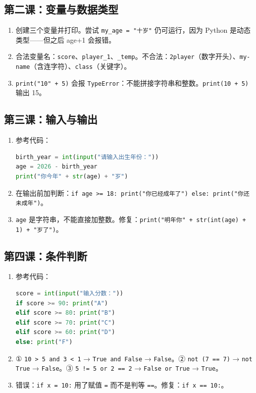 \documentclass[a4paper,12pt]{ctexart}
\begin{document}
\subsection*{第二课：变量与数据类型}
\begin{enumerate}
  \item 创建三个变量并打印。尝试 \texttt{my\_age = "十岁"} 仍可运行，因为 Python 是动态类型——但之后 age+1 会报错。
  \item 合法变量名：\texttt{score}、\texttt{player\_1}、\texttt{\_temp}。不合法：\texttt{2player}（数字开头）、\texttt{my-name}（含连字符）、\texttt{class}（关键字）。
  \item \texttt{print("10" + 5)} 会报 \texttt{TypeError}：不能拼接字符串和整数。\texttt{print(10 + 5)} 输出 15。
\end{enumerate}

\subsection*{第三课：输入与输出}
\begin{enumerate}
  \item 参考代码：
\begin{lstlisting}[language=Python]
birth_year = int(input("请输入出生年份："))
age = 2026 - birth_year
print("你今年" + str(age) + "岁")
\end{lstlisting}
  \item 在输出前加判断：\texttt{if age >= 18: print("你已经成年了") else: print("你还未成年")}。
  \item \texttt{age} 是字符串，不能直接加整数。修复：\texttt{print("明年你" + str(int(age) + 1) + "岁了")}。
\end{enumerate}

\subsection*{第四课：条件判断}
\begin{enumerate}
  \item 参考代码：
\begin{lstlisting}[language=Python]
score = int(input("输入分数："))
if score >= 90: print("A")
elif score >= 80: print("B")
elif score >= 70: print("C")
elif score >= 60: print("D")
else: print("F")
\end{lstlisting}
  \item ① \texttt{10 > 5 and 3 < 1} → \texttt{True and False} → \texttt{False}。② \texttt{not (7 == 7)} → \texttt{not True} → \texttt{False}。③ \texttt{5 != 5 or 2 == 2} → \texttt{False or True} → \texttt{True}。
  \item 错误：\texttt{if x = 10:} 用了赋值 \texttt{=} 而不是判等 \texttt{==}。修复：\texttt{if x == 10:}。
\end{enumerate}
\end{document}
